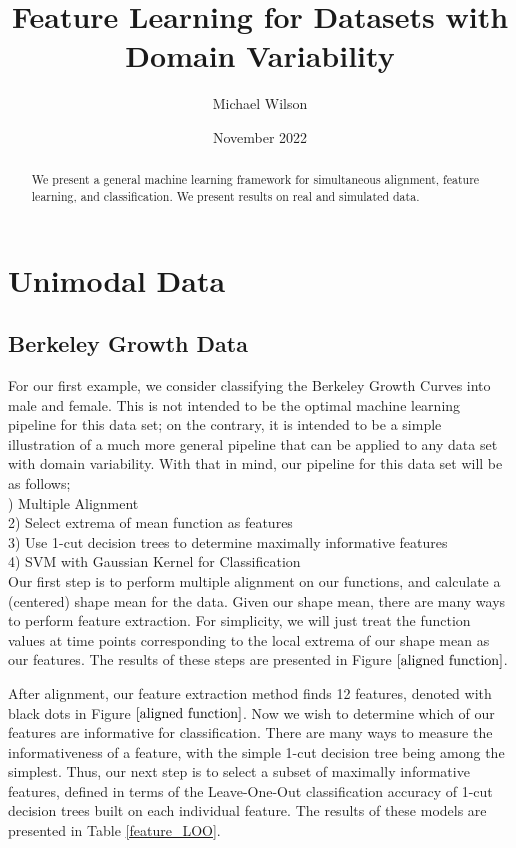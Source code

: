 \documentclass[]{article}
\title{}
\author{}
\begin{document}
\title{Feature Learning for Datasets with Domain Variability}
\author{Michael Wilson}
\date{November 2022}
\maketitle

\begin{abstract}
We present a general machine learning framework for simultaneous alignment, feature learning, and classification. We present results on real and simulated data.  
\end{abstract}

\section{Unimodal Data}

\subsection{Berkeley Growth Data}

For our first example, we consider classifying the Berkeley Growth Curves into male and female. This is not intended to be the optimal machine learning pipeline for this data set; on the contrary, it is intended to be a simple illustration of a much more general pipeline that can be applied to any data set with domain variability. With that in mind, our pipeline for this data set will be as follows;\\

) Multiple Alignment\\
2) Select extrema of mean function as features\\
3) Use 1-cut decision trees to determine maximally informative features\\
4) SVM with Gaussian Kernel for Classification\\

Our first step is to perform multiple alignment on our functions, and calculate a (centered) shape mean for the data. Given our shape mean, there are many ways to perform feature extraction. For simplicity, we will just treat the function values at time points corresponding to the local extrema of our shape mean as our features. The results of these steps are presented in Figure $\ref{aligned function}$. 

After alignment, our feature extraction method finds 12 features, denoted with black dots in Figure $\ref{aligned function}$. Now we wish to determine which of our features are informative for classification. There are many ways to measure the informativeness of a feature, with the simple 1-cut decision tree being among the simplest. Thus, our next step is to select a subset of maximally informative features, defined in terms of the Leave-One-Out classification accuracy of 1-cut decision trees built on each individual feature. The results of these models are presented in Table \ref{feature_LOO}.
\end{document}
